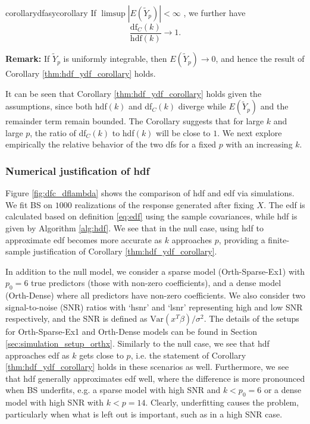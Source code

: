 \begin{restatable}{corollary}{dfasycorollary}
	\label{thm:hdf_ydf_corollary}
	If $\limsup |E(\tilde{Y}_p)| < \infty$ , we further have
	\begin{equation}
	\label{eq:main_corollary}
	\frac{\text{df}_C(k)}{\text{hdf}(k)} \rightarrow 1.
	\end{equation}
\end{restatable}
\noindent\textbf{Remark:} If $\tilde{Y}_p$ is uniformly integrable, then $E(\tilde{Y}_p) \rightarrow 0$, and hence the result of Corollary \ref{thm:hdf_ydf_corollary} holds.

It can be seen that Corollary \ref{thm:hdf_ydf_corollary} holds given the assumptions, since both hdf$(k)$ and df$_C(k)$ diverge while $E(\tilde{Y}_p)$ and the remainder term remain bounded. The Corollary suggests that for large $k$ and large $p$, the ratio of df$_C(k)$ to hdf$(k)$ will be close to $1$. We next explore empirically the relative behavior of the two dfs for a fixed $p$ with an increasing $k$. 

\subsubsection{Numerical justification of hdf}
Figure \ref{fig:dfc_dflambda} shows the comparison of hdf and edf via simulations. We fit BS on $1000$ realizations of the response generated after fixing $X$. The edf is calculated based on definition \eqref{eq:edf} using the sample covariances, while hdf is given by Algorithm \ref{alg:hdf}. We see that in the null case, using hdf to approximate edf becomes more accurate as $k$ approaches $p$, providing a finite-sample justification of Corollary \ref{thm:hdf_ydf_corollary}. 

In addition to the null model, we consider a sparse model (Orth-Sparse-Ex1) with $p_0=6$ true predictors (those with non-zero coefficients), and a dense model (Orth-Dense) where all predictors have non-zero coefficients. We also consider two signal-to-noise (SNR) ratios with `hsnr' and `lsnr' representing high and low SNR respectively, and the SNR is defined as $\text{Var}(x^T \beta)/\sigma^2$. The details of the setups for Orth-Sparse-Ex1 and Orth-Dense models can be found in Section \ref{sec:simulation_setup_orthx}. Similarly to the null case, we see that hdf approaches edf as $k$ gets close to $p$, i.e. the statement of Corollary \ref{thm:hdf_ydf_corollary} holds in these scenarios as well. Furthermore, we see that hdf generally approximates edf well, where the difference is more pronounced when BS underfits, e.g. a sparse model with high SNR and $k<p_0=6$ or a dense model with high SNR with $k<p=14$. Clearly, underfitting causes the problem, particularly when what is left out is important, such as in a high SNR case.   


